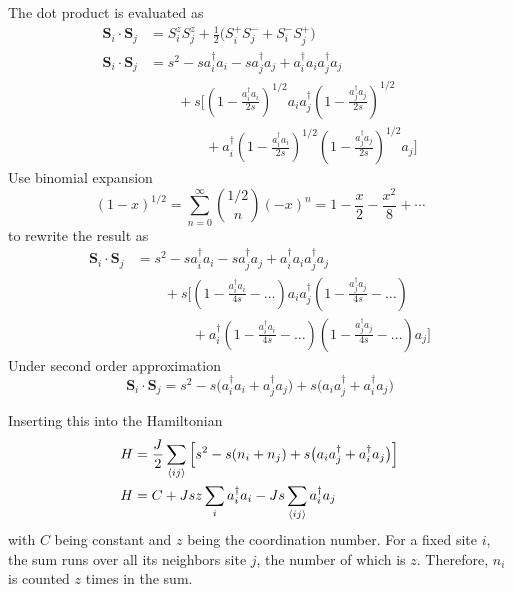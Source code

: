 \documentclass[../../../main.tex]{subfiles}
\begin{document}
The dot product is evaluated as
\begin{align*}
    \mathbf{S}_i \cdot \mathbf{S}_j
     & = S_i^z S_j^z + \frac{1}{2}\bigl(S_i^+ S_j^- + S_i^- S_j^+\bigr)                                                               \\
    \mathbf{S}_i \cdot \mathbf{S}_j
     & = s^2 - s a_i^\dagger a_i - s  a_j^\dagger a_j + a_i^\dagger a_i a_j^\dagger a_j                                               \\
     & \qquad+ s\Bigg[\left(1-\frac{a_i^\dagger a_i}{2s}\right)^{1/2} a_i a_j^\dagger \left(1-\frac{a_j^\dagger a_j}{2s}\right)^{1/2} \\
     & \qquad\qquad+ a_i ^\dagger\left(1-\frac{a_i ^\dagger a_i}{2s}\right)^{1/2}\left(1-\frac{a_j ^\dagger a_j}{2s}\right)^{1/2} a_j
        \Bigg]
\end{align*}
Use binomial expansion
\begin{equation*}
    (1-x)^{1/2} = \sum_{n=0}^{\infty} \binom{1/2}{n}(-x)^n = 1 - \frac{x}{2} - \frac{x^2}{8} + \cdots
\end{equation*}
to rewrite the result as
\begin{align*}
    \mathbf{S}_i \cdot \mathbf{S}_j
     & = s^2 - s a_i^\dagger a_i - s  a_j^\dagger a_j + a_i^\dagger a_i a_j^\dagger a_j                                                     \\
     & \qquad+ s\Bigg[\left(1-\frac{a_i^\dagger a_i}{4s} - \dots\right)  a_i a_j^\dagger \left(1-\frac{a_j^\dagger a_j}{4s} - \dots\right)  \\
     & \qquad\qquad+ a_i ^\dagger\left(1-\frac{a_i ^\dagger a_i}{4s} - \dots\right) \left(1-\frac{a_j ^\dagger a_j}{4s} - \dots\right)  a_j
        \Bigg]
\end{align*}
Under second order approximation
\begin{equation*}
    \mathbf{S}_i \cdot \mathbf{S}_j  = s^2 - s\big(a_i^\dagger a_i + a_j^\dagger a_j\big) + s\big(a_i a_j ^\dagger+ a_i^\dagger a_j\big)
\end{equation*}

Inserting this into the Hamiltonian
\begin{align*}
    H
      & = \frac{J }{2} \sum_{\braket{ij }} \left[ s^2 - s(n_i+n_j) + s\big(a_i a_j ^\dagger+ a_i^\dagger a_j \big) \right] \\
    H & =  C + J s z \sum_i a_i ^\dagger a_i - Js\sum_{\braket{ i j}} a_i^\dagger a_j
\end{align*}
with $C$ being constant and $z$ being the coordination number.
For a fixed  site $i$, the sum runs over all its neighbors site $j$, the number of which is $z$.
Therefore, $n_i$ is counted $z$ times in the sum.
\end{document}
